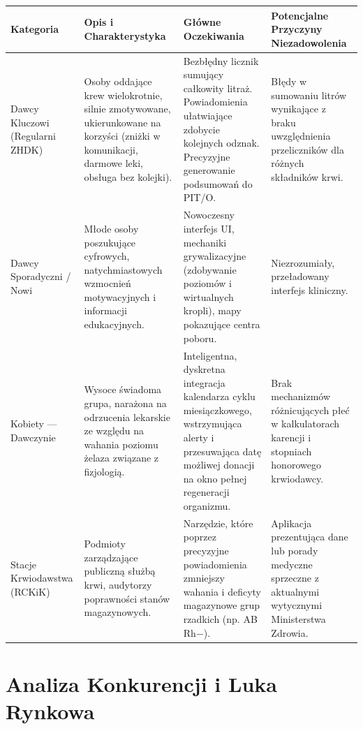 \documentclass[11pt, a4paper]{article}
\begin{document}
\begin{center}
\begin{tabularx}{\linewidth}{L{2.6cm} X X L{3cm}}
  \toprule
  \textbf{Kategoria} & \textbf{Opis i Charakterystyka} & \textbf{Główne Oczekiwania} & \textbf{Potencjalne Przyczyny Niezadowolenia} \\
  \midrule
  Dawcy Kluczowi (Regularni ZHDK)
    & Osoby oddające krew wielokrotnie, silnie zmotywowane, ukierunkowane
      na korzyści (zniżki w komunikacji, darmowe leki, obsługa bez kolejki).
    & Bezbłędny licznik sumujący całkowity litraż. Powiadomienia ułatwiające
      zdobycie kolejnych odznak. Precyzyjne generowanie podsumowań do PIT/O.
    & Błędy w sumowaniu litrów wynikające z braku uwzględnienia przeliczników
      dla różnych składników krwi. \\
  \addlinespace
  Dawcy Sporadyczni / Nowi
    & Młode osoby poszukujące cyfrowych, natychmiastowych wzmocnień
      motywacyjnych i informacji edukacyjnych.
    & Nowoczesny interfejs UI, mechaniki grywalizacyjne (zdobywanie poziomów
      i wirtualnych kropli), mapy pokazujące centra poboru.
    & Niezrozumiały, przeładowany interfejs kliniczny. \\
  \addlinespace
  Kobiety — Dawczynie
    & Wysoce świadoma grupa, narażona na odrzucenia lekarskie ze względu
      na wahania poziomu żelaza związane z fizjologią.
    & Inteligentna, dyskretna integracja kalendarza cyklu miesiączkowego,
      wstrzymująca alerty i przesuwająca datę możliwej donacji na okno
      pełnej regeneracji organizmu.
    & Brak mechanizmów różnicujących płeć w kalkulatorach karencji
      i stopniach honorowego krwiodawcy. \\
  \addlinespace
  Stacje Krwiodawstwa (RCKiK)
    & Podmioty zarządzające publiczną służbą krwi, audytorzy poprawności
      stanów magazynowych.
    & Narzędzie, które poprzez precyzyjne powiadomienia zmniejszy wahania
      i deficyty magazynowe grup rzadkich (np. AB Rh$-$).
    & Aplikacja prezentująca dane lub porady medyczne sprzeczne
      z aktualnymi wytycznymi Ministerstwa Zdrowia. \\
  \bottomrule
\end{tabularx}
\end{center}

\section{Analiza Konkurencji i Luka Rynkowa}
\end{document}
